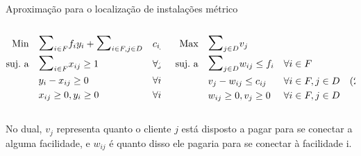 \documentclass[final]{beamer}
\begin{document}
\begin{frame}[t]
\begin{columns}[t]
\begin{column}{0.48\paperwidth}
\begin{block}{Aproximação para o localização de instalações métrico}
      \begin{shaded}
        \vspace{-.8cm}
      \begin{columns}
        \begin{column}{0.23\paperwidth}
          \begin{subequations}
            \begin{align*}
              \text{Min} \quad & \scalebox{1.5}{$\sum$}_{i \in F}f_iy_i + \scalebox{1.5}{$\sum$}_{i\in F,j\in D} &&c_{ij}x_{ij} \\
              \text{suj.\ a} \quad & \scalebox{1.5}{$\sum$}_{i\in F} x_{ij}\geq1 && \forall j \in D \\
              &y_i - x_{ij} \geq 0 && \forall i\in F,j\in D \\
              &x_{ij} \geq 0,y_i \geq 0 && \forall i\in F,j\in D \\
            \end{align*}
          \end{subequations}
        \end{column}
        
        
        
        \begin{column}{0.23\paperwidth}
          \begin{subequations}
            \begin{align*}
              \text{Max} \quad & \scalebox{1.5}{$\sum$}_{j \in D} v_{j}\\
              \text{suj.\ a} \quad & \scalebox{1.5}{$\sum$}_{j\in D} w_{ij}\leq f_i && \forall i \in F \hspace{2.8cm} (1)\\
              &v_{j} - w_{ij}\leq c_{ij} && \forall i\in F,j\in D \quad(2)\\
              &w_{ij} \geq 0, v_j\geq 0 && \forall i\in F,j\in D\\
            \end{align*}
          \end{subequations}
        \end{column}
      \end{columns}
      \vspace{-.8cm}
      \end{shaded}

      No dual, $v_j$ representa quanto o cliente $j$ está disposto a pagar para se conectar a alguma facilidade, e $w_{ij}$ é quanto disso ele pagaria para se conectar à facilidade i.


\end{block}
\end{column}
\end{columns}
\end{frame}
\end{document}
